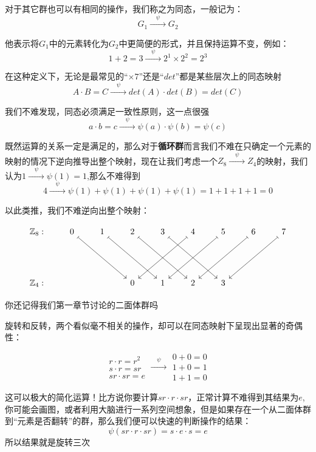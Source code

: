 \documentclass[UTF8]{ctexbook}
\begin{document}
对于其它群也可以有相同的操作，我们称之为同态，一般记为：
\[
G_1 \xrightarrow{\quad \psi \quad } G_2
\]

他表示将$G_1$中的元素转化为$G_2$中更简便的形式，并且保持运算不变，例如：
\[
  1+2=3\xrightarrow{\quad \psi \quad } 2^1\times 2^2=2^3
\]

在这种定义下，无论是最常见的“$\times 7 $”还是“$det $”都是某些层次上的同态映射
\[
A \cdot B = C \xrightarrow{\quad \psi \quad } det(A) \cdot det(B) = det(C)
\]

我们不难发现，同态必须满足一致性原则，这一点很强
\[
a \cdot b = c \xrightarrow{\quad \psi \quad } \psi(a) \cdot \psi(b) = \psi(c)
\]

既然运算的关系一定是满足的，那么对于\textbf{循环群}而言我们不难在只确定一个元素的映射的情况下逆向推导出整个映射，现在让我们考虑一个$Z_8 \xrightarrow{\quad \psi \quad } Z_4$的映射，我们认为$1\xrightarrow{\quad \psi \quad }\psi(1)=1$,那么不难得到
\[
4\xrightarrow{\quad \psi \quad }\psi(1)+\psi(1)+\psi(1)+\psi(1)=1+1+1+1=0
\]

以此类推，我们不难逆向出整个映射：

\[
\begin{tikzcd}[column sep=2.2em, row sep=4.5em]
\mathbb{Z}_8:
& 0 \arrow[drr, mapsto]
& 1 \arrow[drr, mapsto]
& 2 \arrow[drr, mapsto]
& 3 \arrow[drr, mapsto]
& 4 \arrow[dll, mapsto]
& 5 \arrow[dll, mapsto]
& 6 \arrow[dll, mapsto]
& 7 \arrow[dll, mapsto] \\
\mathbb{Z}_4:
&
&
& 0
& 1
& 2
& 3
\end{tikzcd}
\]

你还记得我们第一章节讨论的二面体群吗

旋转和反转，两个看似毫不相关的操作，却可以在同态映射下呈现出显著的奇偶性：

\[
\begin{matrix}
r \cdot r = r^2\\
s \cdot r = sr\\
sr \cdot sr =e
\end{matrix}  
\xrightarrow{\quad \psi \quad }
\begin{matrix}
0 + 0 = 0\\
1 + 0 = 1\\
1 + 1 = 0
\end{matrix}  
\]



这可以极大的简化运算！比方说你要计算$sr \cdot r \cdot sr$，正常计算不难得到其结果为$e$,你可能会画图，或者利用大脑进行一系列空间想象，但是如果存在一个从二面体群到“元素是否翻转”的群，那么我们便可以快速的判断操作的结果：
\[
\psi(sr \cdot r \cdot sr) =s \cdot e \cdot s = e
\]
所以结果就是旋转三次
\end{document}
